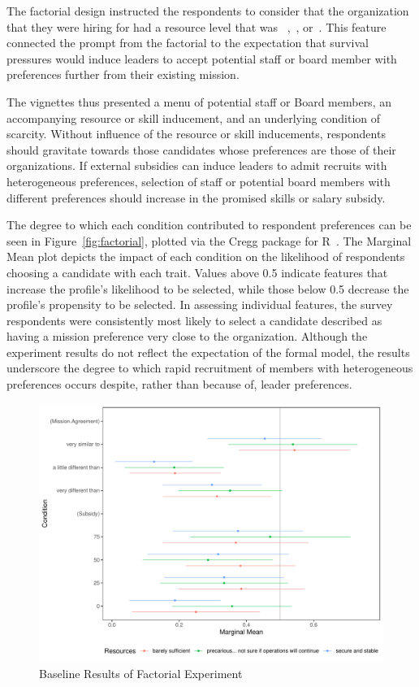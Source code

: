 The factorial design instructed the respondents to consider that the organization that they were hiring for had a resource level that was ~,~, or~. This feature connected the prompt from the factorial to the expectation that survival pressures would induce leaders to accept potential staff or board member with preferences further from their existing mission.

The vignettes thus presented a menu of potential staff or Board members, an accompanying resource or skill inducement, and an underlying condition of scarcity. Without influence of the resource or skill inducements, respondents should gravitate towards those candidates whose preferences are  those of their organizations. If external subsidies can induce leaders to admit recruits with heterogeneous preferences, selection of staff or potential board members with different preferences should increase in the promised skills or salary subsidy. 

The degree to which each condition contributed to respondent preferences can be seen in Figure~\ref{fig:factorial}, plotted via the Cregg package for R~\autocite{leeper2018cregg}. The Marginal Mean plot depicts the impact of each condition on the likelihood of respondents choosing a candidate with each trait. Values above 0.5 indicate features that increase the profile's likelihood to be selected, while those below 0.5 decrease the profile's propensity to be selected.  In assessing individual features, the survey respondents were consistently most likely to select a candidate described as having a mission preference very close to the organization. Although the experiment results do not reflect the expectation of the formal model, the results underscore the degree to which rapid recruitment of members with heterogeneous preferences occurs despite, rather than because of, leader preferences.


\begin{figure}[t]
\centering
\includegraphics[width=.85\columnwidth]{./Pictures/simpleConjoint.pdf}
\caption{Baseline Results of Factorial Experiment}
\label{fig:factorial1}
\end{figure}


